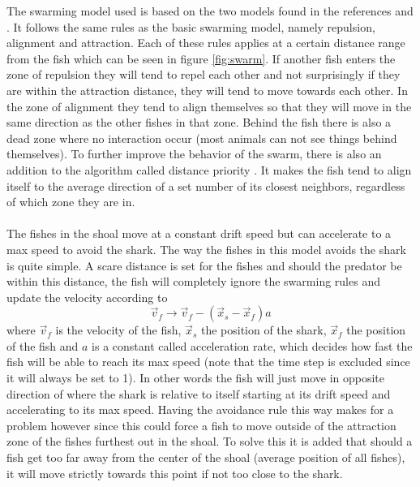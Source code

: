 The swarming model used is based on the two models found in the references \cite{javafish} and \cite{matlabfish}. It follows the same rules as the basic swarming model, namely repulsion, alignment and attraction. Each of these rules applies at a certain distance range from the fish which can be seen in figure \ref{fig:swarm}. If another fish enters the zone of repulsion they will tend to repel each other and not surprisingly if they are within the attraction distance, they will tend to move towards each other. In the zone of alignment they tend to align themselves so that they will move in the same direction as the other fishes in that zone. Behind the fish there is also a dead zone where no interaction occur (most animals can not see things behind themselves). To further improve the behavior of the swarm, there is also an addition to the algorithm called distance priority \cite{matlabfish}. It makes the fish tend to align itself to the average direction of a set number of its closest neighbors, regardless of which zone they are in.\\
\\
The fishes in the shoal move at a constant drift speed but can accelerate to a max speed to avoid the shark. The way the fishes in this model avoids the shark is quite simple. A scare distance is set for the fishes and should the predator be within this distance, the fish will completely ignore the swarming rules and update the velocity according to
\begin{equation}
\vec{v}_f \rightarrow \vec{v}_f - (\vec{x}_s - \vec{x}_f)a
\end{equation}
where $\vec{v}_f$ is the velocity of the fish, $\vec{x}_s$ the position of the shark, $\vec{x}_f$ the position of the fish and $a$ is a constant called acceleration rate, which decides how fast the fish will be able to reach its max speed (note that the time step is excluded since it will always be set to 1). In other words the fish will just move in opposite direction of where the shark is relative to itself starting at its drift speed and accelerating to its max speed. Having the avoidance rule this way makes for a problem however since this could force a fish to move outside of the attraction zone of the fishes furthest out in the shoal. To solve this it is added that should a fish get too far away from the center of the shoal (average position of all fishes), it will move strictly towards this point if not too close to the shark.


